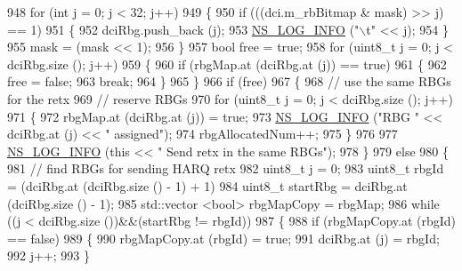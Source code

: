 \begin{DoxyCode}
948           \textcolor{keywordflow}{for} (\textcolor{keywordtype}{int} j = 0; j < 32; j++)
949             \{
950               \textcolor{keywordflow}{if} (((dci.m\_rbBitmap & mask) >> j) == 1)
951                 \{
952                   dciRbg.push\_back (j);
953                   \hyperlink{group__logging_gafbd73ee2cf9f26b319f49086d8e860fb}{NS\_LOG\_INFO} (\textcolor{stringliteral}{"\(\backslash\)t"} << j);
954                 \}
955               mask = (mask << 1);
956             \}
957           \textcolor{keywordtype}{bool} free = \textcolor{keyword}{true};
958           \textcolor{keywordflow}{for} (uint8\_t j = 0; j < dciRbg.size (); j++)
959             \{
960               \textcolor{keywordflow}{if} (rbgMap.at (dciRbg.at (j)) == \textcolor{keyword}{true})
961                 \{
962                   free = \textcolor{keyword}{false};
963                   \textcolor{keywordflow}{break};
964                 \}
965             \}
966           \textcolor{keywordflow}{if} (free)
967             \{
968               \textcolor{comment}{// use the same RBGs for the retx}
969               \textcolor{comment}{// reserve RBGs}
970               \textcolor{keywordflow}{for} (uint8\_t j = 0; j < dciRbg.size (); j++)
971                 \{
972                   rbgMap.at (dciRbg.at (j)) = \textcolor{keyword}{true};
973                   \hyperlink{group__logging_gafbd73ee2cf9f26b319f49086d8e860fb}{NS\_LOG\_INFO} (\textcolor{stringliteral}{"RBG "} << dciRbg.at (j) << \textcolor{stringliteral}{" assigned"});
974                   rbgAllocatedNum++;
975                 \}
976 
977               \hyperlink{group__logging_gafbd73ee2cf9f26b319f49086d8e860fb}{NS\_LOG\_INFO} (\textcolor{keyword}{this} << \textcolor{stringliteral}{" Send retx in the same RBGs"});
978             \}
979           \textcolor{keywordflow}{else}
980             \{
981               \textcolor{comment}{// find RBGs for sending HARQ retx}
982               uint8\_t j = 0;
983               uint8\_t rbgId = (dciRbg.at (dciRbg.size () - 1) + 1) %
984               uint8\_t startRbg = dciRbg.at (dciRbg.size () - 1);
985               std::vector <bool> rbgMapCopy = rbgMap;
986               \textcolor{keywordflow}{while} ((j < dciRbg.size ())&&(startRbg != rbgId))
987                 \{
988                   \textcolor{keywordflow}{if} (rbgMapCopy.at (rbgId) == \textcolor{keyword}{false})
989                     \{
990                       rbgMapCopy.at (rbgId) = \textcolor{keyword}{true};
991                       dciRbg.at (j) = rbgId;
992                       j++;
993                     \}

\end{DoxyCode}
